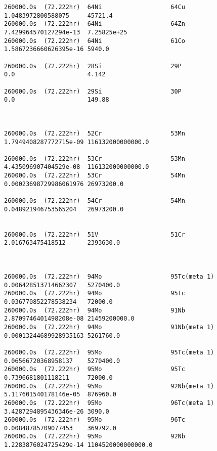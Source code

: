 \begin{lstlisting}[style=sOutputFile,caption={Final results for steel irradiation},label={listing:alexsteel}]
260000.0s  (72.222hr)  64Ni                   64Cu                   1.0483972800588075     45721.4               
260000.0s  (72.222hr)  64Ni                   64Zn                   7.429964570127294e-13  7.25825e+25           
260000.0s  (72.222hr)  64Ni                   61Co                   1.5867236660626395e-16 5940.0                

260000.0s  (72.222hr)  28Si                   29P                    0.0                    4.142                 

260000.0s  (72.222hr)  29Si                   30P                    0.0                    149.88                



260000.0s  (72.222hr)  52Cr                   53Mn                   1.7949408287772715e-09 116132000000000.0     

260000.0s  (72.222hr)  53Cr                   53Mn                   4.435096907404529e-08  116132000000000.0     
260000.0s  (72.222hr)  53Cr                   54Mn                   0.00023698729986061976 26973200.0            

260000.0s  (72.222hr)  54Cr                   54Mn                   0.048921946753565204   26973200.0            


260000.0s  (72.222hr)  51V                    51Cr                   2.016763475418512      2393630.0             



260000.0s  (72.222hr)  94Mo                   95Tc(meta 1)           0.006428513714662307   5270400.0             
260000.0s  (72.222hr)  94Mo                   95Tc                   0.036770852278538234   72000.0               
260000.0s  (72.222hr)  94Mo                   91Nb                   2.8709746401498208e-08 21459200000.0         
260000.0s  (72.222hr)  94Mo                   91Nb(meta 1)           0.00013244689928935163 5261760.0             

260000.0s  (72.222hr)  95Mo                   95Tc(meta 1)           0.06566720368958137    5270400.0             
260000.0s  (72.222hr)  95Mo                   95Tc                   0.7396681801118211     72000.0               
260000.0s  (72.222hr)  95Mo                   92Nb(meta 1)           5.117601540178146e-05  876960.0              
260000.0s  (72.222hr)  95Mo                   96Tc(meta 1)           3.4287294895436346e-26 3090.0                
260000.0s  (72.222hr)  95Mo                   96Tc                   0.00848785709077453    369792.0              
260000.0s  (72.222hr)  95Mo                   92Nb                   1.2283876024725429e-14 1104520000000000.0    


\end{lstlisting}
